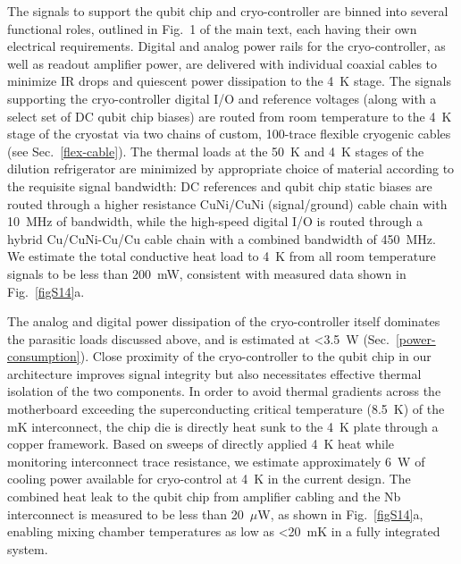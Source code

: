 \documentclass[aps,prl,twocolumn,superscriptaddress,nobibnotes,10pt,floatfix]{revtex4-2}
\newcommand{\secref}[1]{Sec.~\ref{#1}}
\newcommand{\figref}[1]{Fig.~\ref{#1}}
\begin{document}
The signals to support the qubit chip and cryo-controller are binned into several functional roles, outlined in Fig.~1 of the main text, each having their own electrical requirements.
Digital and analog power rails for the cryo-controller, as well as readout amplifier power, are delivered with individual coaxial cables to minimize IR drops and quiescent power dissipation to the 4~K stage.
The signals supporting the cryo-controller digital I/O and reference voltages (along with a select set of DC qubit chip biases) are routed from room temperature to the 4~K stage of the cryostat via two chains of custom, 100-trace flexible cryogenic cables (see  \secref{flex-cable}).
The thermal loads at the 50~K and 4~K stages of the dilution refrigerator are minimized by appropriate choice of material according to the requisite signal bandwidth: DC references and qubit chip static biases are routed through a higher resistance CuNi/CuNi (signal/ground) cable chain with 10~MHz of bandwidth, while the high-speed digital I/O is routed through a hybrid Cu/CuNi-Cu/Cu cable chain with a combined bandwidth of 450~MHz.
We estimate the total conductive heat load to 4~K from all room temperature signals to be less than 200~mW, consistent with measured data shown in \figref{figS14}a.

The analog and digital power dissipation of the cryo-controller itself dominates the parasitic loads discussed above, and is estimated at \textless3.5~W (\secref{power-consumption}).
Close proximity of the cryo-controller to the qubit chip in our architecture improves signal integrity but also necessitates effective thermal isolation of the two components.
In order to avoid thermal gradients across the motherboard exceeding the superconducting critical temperature (8.5~K) of the mK interconnect, the chip die is directly heat sunk to the 4~K plate through a copper framework.
Based on sweeps of directly applied 4~K heat while monitoring interconnect trace resistance, we estimate approximately 6~W of cooling power available for cryo-control at 4~K in the current design.
The combined heat leak to the qubit chip from amplifier cabling and the Nb interconnect is measured to be less than 20~$\mu$W, as shown in \figref{figS14}a, enabling mixing chamber temperatures as low as \textless20~mK in a fully integrated system.
\end{document}
